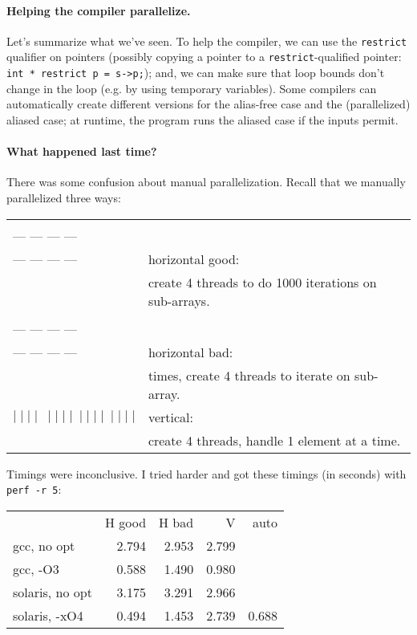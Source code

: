 \documentclass[11pt]{article}
\begin{document}
\paragraph{Helping the compiler parallelize.} Let's summarize what we've
seen. To help the compiler, we can use the {\tt restrict} qualifier on
pointers (possibly copying a pointer to a {\tt restrict}-qualified
pointer: {\tt int * restrict p = s->p;}); and, we can make sure that
loop bounds don't change in the loop (e.g. by using temporary
variables). Some compilers can automatically create different versions
for the alias-free case and the (parallelized) aliased case; at
runtime, the program runs the aliased case if the inputs permit.

\paragraph{What happened last time?} There was some confusion about manual parallelization. Recall that we manually parallelized three ways:

\begin{tabular}{ll}
  \begin{minipage}{5em} --- --- --- ---\\[-.8em] --- --- --- ---\\[-.8em] --- --- --- --- \end{minipage}& horizontal good: \\
      & \qquad create 4 threads to do 1000 iterations on sub-arrays.\\
      \begin{minipage}{5em} --- --- --- ---\\[-.8em] --- --- --- ---\\[-.8em] --- --- --- --- \end{minipage}& horizontal bad: \\
      & \qquad 1000 times, create 4 threads to iterate on sub-array. \\
      $ \mid \mid \mid\mid \: \mid \mid \mid \mid \: \mid \mid \mid \mid\: \mid \mid \mid \mid$& vertical:\\
      & \qquad create 4 threads, handle 1 element at a time.\\[1em]
\end{tabular}

Timings were inconclusive. I tried harder and got these
timings (in seconds) with {\tt perf -r 5}:

      \begin{center}
      \begin{tabular}{lrrrr}
        & H good & H bad & V & auto \\
        gcc, no opt & 2.794 & 2.953 & 2.799\\
        gcc, -O3 & 0.588 & 1.490 & 0.980\\
        solaris, no opt & 3.175 & 3.291 & 2.966 \\
        solaris, -xO4 & 0.494 & 1.453 & 2.739 & 0.688\\
      \end{tabular}
      \end{center}
\end{document}
